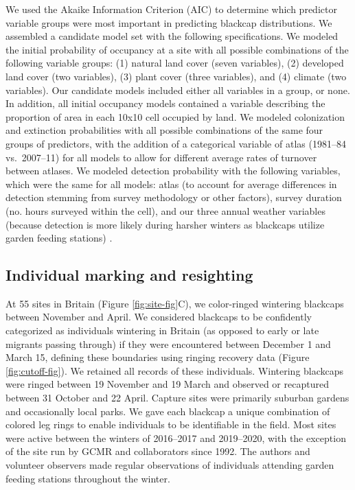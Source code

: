 \documentclass[a4paper, nobind]{templates/ociamthesis}
\begin{document}
We used the Akaike Information Criterion (AIC) to determine which predictor variable groups were most important in predicting blackcap distributions. We assembled a candidate model set with the following specifications. We modeled the initial probability of occupancy at a site with all possible combinations of the following variable groups: (1) natural land cover (seven variables), (2) developed land cover (two variables), (3) plant cover (three variables), and (4) climate (two variables). Our candidate models included either all variables in a group, or none. In addition, all initial occupancy models contained a variable describing the proportion of area in each 10x10 cell occupied by land. We modeled colonization and extinction probabilities with all possible combinations of the same four groups of predictors, with the addition of a categorical variable of atlas (1981--84 vs.~2007--11) for all models to allow for different average rates of turnover between atlases. We modeled detection probability with the following variables, which were the same for all models: atlas (to account for average differences in detection stemming from survey methodology or other factors), survey duration (no. hours surveyed within the cell), and our three annual weather variables (because detection is more likely during harsher winters as blackcaps utilize garden feeding stations) \autocite{plummerSupplementaryFeedingGardens2015}.

\hypertarget{individual-marking-and-resighting}{%
\subsection{Individual marking and resighting}\label{individual-marking-and-resighting}}

At 55 sites in Britain (Figure \ref{fig:site-fig}C), we color-ringed wintering blackcaps between November and April. We considered blackcaps to be confidently categorized as individuals wintering in Britain (as opposed to early or late migrants passing through) if they were encountered between December 1 and March 15, defining these boundaries using ringing recovery data (Figure \ref{fig:cutoff-fig}). We retained all records of these individuals. Wintering blackcaps were ringed between 19 November and 19 March and observed or recaptured between 31 October and 22 April. Capture sites were primarily suburban gardens and occasionally local parks. We gave each blackcap a unique combination of colored leg rings to enable individuals to be identifiable in the field. Most sites were active between the winters of 2016--2017 and 2019--2020, with the exception of the site run by GCMR and collaborators since 1992. The authors and volunteer observers made regular observations of individuals attending garden feeding stations throughout the winter.
\end{document}
